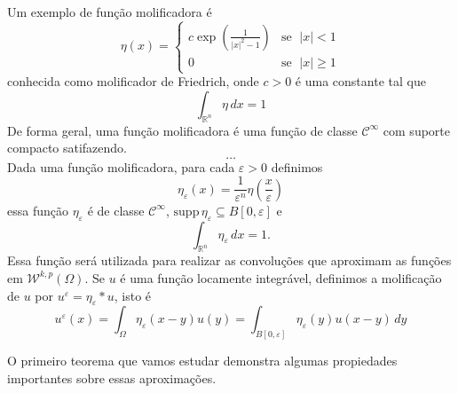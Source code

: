 \documentclass[a4paper, 11pt]{book}
\theoremstyle{definition}
\newcommand{\bR}{\mathbb{R}}
\newcommand{\cC}{\mathcal{C}}
\newcommand{\cW}{\mathcal{W}}
\newcommand{\supp}{\mathrm{supp}\,}
\begin{document}
Um exemplo de função molificadora é
\begin{equation} \label{eq:molificador-friedrich}
    \eta(x) =
    \left\{
        \begin{array}{lr}
            c \exp \left( \frac{1}{|x|^2 - 1} \right) & \text{se }\; |x| < 1\\
            0 & \text{se }\; |x| \geqslant 1
        \end{array}
    \right.
\end{equation}
conhecida como molificador de Friedrich, onde $c > 0$ é uma constante tal que
\[
    \int_{\bR^n} \eta \,dx = 1
\]
De forma geral, uma função molificadora é uma função de classe $\cC^\infty$ com suporte compacto satifazendo. 
\[
    \dots
\]
Dada uma função molificadora, para cada $\varepsilon > 0$ definimos
\begin{equation} \label{eq:eta-epsilon}
    \eta_\varepsilon(x) = \frac{1}{\varepsilon^n} \eta\left( \frac{x}{\varepsilon} \right)
\end{equation}
essa função $\eta_\varepsilon$ é de classe $\cC^\infty$, $\supp \eta_\varepsilon \subseteq B[0,\varepsilon]$ e
\[
    \int_{\bR^n} \eta_\varepsilon \,dx = 1.
\]
Essa função será utilizada para realizar as convoluções que aproximam as funções em $\cW^{k,p}(\Omega)$. Se $u$ é uma função locamente integrável, definimos a molificação de $u$ por $u^\varepsilon = \eta_\varepsilon * u$, isto é
\[
    u^\varepsilon(x) = \int_\Omega \eta_\varepsilon(x-y) u(y) = \int_{B[0,\varepsilon]} \eta_\varepsilon(y) u(x-y) \,dy
\]

O primeiro teorema que vamos estudar demonstra algumas propiedades importantes sobre essas aproximações.
\end{document}
